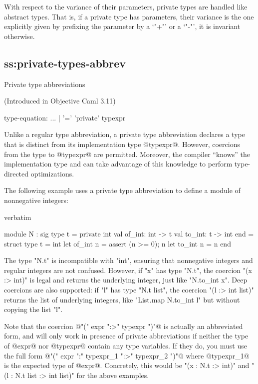 With respect to the variance of their parameters, private types are
handled like abstract types. That is, if a private type has
parameters, their variance is the one explicitly given by prefixing
the parameter by a `"+"' or a `"-"', it is invariant otherwise.

\subsection{ss:private-types-abbrev}{Private type abbreviations}

(Introduced in Objective Caml 3.11)

\begin{syntax}
type-equation:
          ...
        | '=' 'private' typexpr
\end{syntax}

Unlike a regular type abbreviation, a private type abbreviation
declares a type that is distinct from its implementation type @typexpr@.
However, coercions from the type to @typexpr@ are permitted.
Moreover, the compiler ``knows'' the implementation type and can take
advantage of this knowledge to perform type-directed optimizations.

The following example uses a private type abbreviation to define a
module of nonnegative integers:
\begin{camlexample}{verbatim}
\begin{caml}
\begin{camlinput}
module N : sig
  type t = private int
  val of_int: int -> t
  val to_int: t -> int
end = struct
  type t = int
  let of_int n = assert (n >= 0); n
  let to_int n = n
end
\end{camlinput}
\end{caml}
\end{camlexample}
The type "N.t" is incompatible with "int", ensuring that nonnegative
integers and regular integers are not confused.  However, if "x" has
type "N.t", the coercion "(x :> int)" is legal and returns the
underlying integer, just like "N.to_int x".  Deep coercions are also
supported: if "l" has type "N.t list", the coercion "(l :> int list)"
returns the list of underlying integers, like "List.map N.to_int l"
but without copying the list "l".

Note that the coercion @"(" expr ":>" typexpr ")"@ is actually an abbreviated
form,
and will only work in presence of private abbreviations if neither the
type of @expr@ nor @typexpr@ contain any type variables. If they do,
you must use the full form @"(" expr ":" typexpr_1 ":>" typexpr_2 ")"@ where
@typexpr_1@ is the expected type of @expr@. Concretely, this would be "(x :
N.t :> int)" and "(l : N.t list :> int list)" for the above examples.

